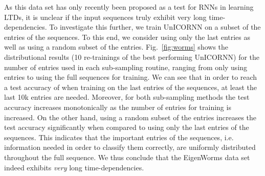 \documentclass[a4paper]{article}
\newcommand{\fref}[1] {Fig.~\ref{#1}}
\begin{document}
\par As this data set has only recently been proposed as a test for RNNs in learning LTDs, it is unclear if the input sequences truly exhibit very long time-dependencies. To investigate this further, we train UnICORNN on a subset of the entries of the sequences. To this end, we consider using only the last entries as well as using a random subset of the entries. \fref{fig:worms} shows the distributional results (10 re-trainings of the best performing UnICORNN) for the number of entries used in each sub-sampling routine, ranging from only using  entries to using the full sequences for training. We can see that in order to reach a test accuracy of  when training on the last entries of the sequences, at least the last 10k entries are needed. Moreover, for both sub-sampling methods the test accuracy increases monotonically as the number of entries for training is increased. On the other hand, using a random subset of the entries increases the test accuracy significantly when compared to using only the last entries of the sequences. This indicates that the important entries of the sequences, i.e. information needed in order to classify them correctly, are uniformly distributed throughout the full sequence. We thus conclude that the EigenWorms data set indeed exhibits \emph{very} long time-dependencies.
\end{document}
